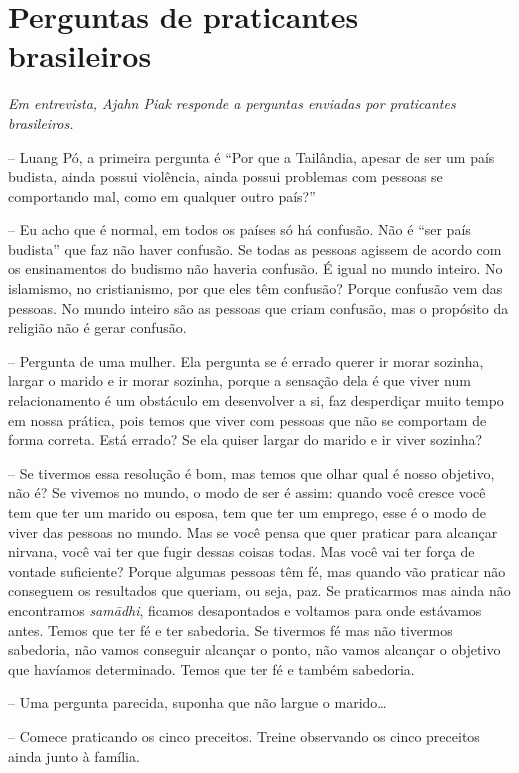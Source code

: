 
\chapter{Perguntas de praticantes brasileiros}

{\itshape
Em entrevista, Ajahn Piak responde a perguntas enviadas por praticantes
brasileiros.}

-- Luang Pó, a primeira pergunta é “Por que a Tailândia, apesar de
ser um país budista, ainda possui violência, ainda possui problemas com
pessoas se comportando mal, como em qualquer outro país?”

-- Eu acho que é normal, em todos os países só há confusão. Não é
“ser país budista” que faz não haver confusão. Se todas as pessoas
agissem de acordo com os ensinamentos do budismo não haveria confusão.
É igual no mundo inteiro. No islamismo, no cristianismo, por que eles
têm confusão? Porque confusão vem das pessoas. No mundo inteiro são as
pessoas que criam confusão, mas o propósito da religião não é gerar
confusão. 

-- Pergunta de uma mulher. Ela pergunta se é errado querer ir morar
sozinha, largar o marido e ir morar sozinha, porque a sensação dela é
que viver num relacionamento é um obstáculo em desenvolver a si, faz
desperdiçar muito tempo em nossa prática, pois temos que viver com
pessoas que não se comportam de forma correta. Está errado? Se ela
quiser largar do marido e ir viver sozinha?

-- Se tivermos essa resolução é bom, mas temos que olhar qual é
nosso objetivo, não é? Se vivemos no mundo, o modo de ser é assim:
quando você cresce você tem que ter um marido ou esposa, tem que ter um
emprego, esse é o modo de viver das pessoas no mundo. Mas se você pensa
que quer praticar para alcançar nirvana, você vai ter que fugir dessas
coisas todas. Mas você vai ter força de vontade suficiente? Porque
algumas pessoas têm fé, mas quando vão praticar não conseguem os
resultados que queriam, ou seja, paz. Se praticarmos mas ainda não
encontramos \textit{samādhi}, ficamos desapontados e voltamos para
onde estávamos antes. Temos que ter fé e ter sabedoria. Se tivermos fé
mas não tivermos sabedoria, não vamos conseguir alcançar o ponto, não
vamos alcançar o objetivo que havíamos determinado. Temos que ter fé e
também sabedoria.

-- Uma pergunta parecida, suponha que não largue o marido…

-- Comece praticando os cinco preceitos. Treine observando os cinco
preceitos ainda junto à família.

